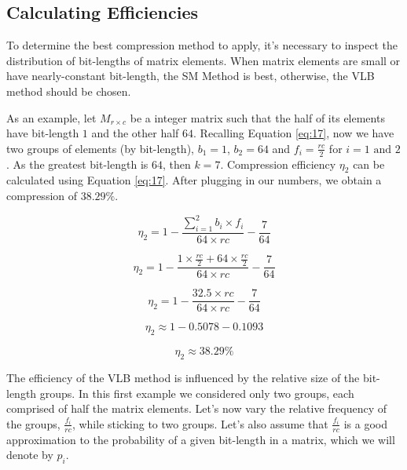 \documentclass[10pt]{article}
\begin{document}
\subsection*{Calculating Efficiencies}

To determine the best compression method to apply, it's necessary to inspect the distribution of bit-lengths of matrix elements. When matrix elements are small or have nearly-constant bit-length, the SM Method is best, otherwise, the VLB method should be chosen.

As an example, let $M_{r\times c}$ be a integer matrix such that the half of its elements have bit-length $1$ and the other half $64$. Recalling Equation \ref{eq:17}, now we have two groups of elements (by bit-length), $b_1=1 $, $b_2=64$ and $f_i = \frac{rc}{2}$ for $i = 1 \text{ and } 2$. As the greatest bit-length is $64$, then $k=7$. Compression efficiency $\eta_2$ can be calculated using Equation \ref{eq:17}. After plugging in our numbers, we obtain a compression of $38.29\%$.

\begin{equation*}\label{eq:25}
 \eta_2 = 1 - \frac{\sum_{i=1}^{2}  b_i \times f_i }{64 \times rc} - \frac{7}{64} 
\end{equation*}

\begin{equation*}\label{eq:26}
 \eta_2 = 1 - \frac{  1 \times \frac{rc}{2} + 64 \times \frac{rc}{2} }{64 \times rc} - \frac{7}{64} 
\end{equation*}

\begin{equation*}\label{eq:26}
 \eta_2 = 1 - \frac{  32.5  \times rc }{64 \times rc} - \frac{7}{64} 
\end{equation*}

\begin{equation*}\label{eq:27}
 \eta_2 \approx 1 - 0.5078 - 0.1093
\end{equation*}

\begin{equation*}\label{eq:28}
 \eta_2 \approx 38.29\%
\end{equation*}

The efficiency of the VLB method is influenced by the relative size of the bit-length groups. In this first example we considered only two groups, each comprised of half the matrix elements. Let's now vary the relative frequency of the groups, $\frac{f_i}{rc}$, while sticking to two groups. Let's also assume that $\frac{f_i}{rc}$ is a good approximation to the probability of a given bit-length in a matrix, which we will denote by $p_i$.
\end{document}
